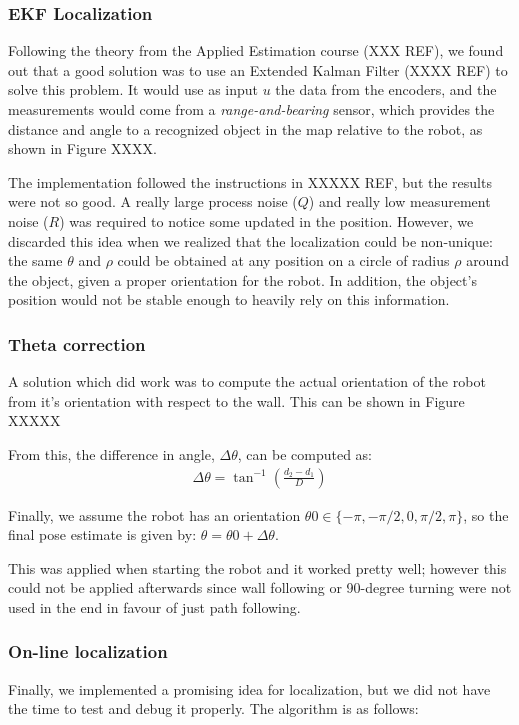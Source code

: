 \subsubsection{EKF Localization}
Following the theory from the Applied Estimation course (XXX REF), we found out that a good solution was to use an Extended Kalman Filter (XXXX REF) to solve this problem. It would use as input $u$ the data from the encoders, and the measurements would come from a \emph{range-and-bearing} sensor, which provides the distance and angle to a recognized object in the map relative to the robot, as shown in Figure XXXX.

The implementation followed the instructions in XXXXX REF, but the results were not so good. A really large process noise ($Q$) and really low measurement noise ($R$) was required to notice some updated in the position. However, we discarded this idea when we realized that the localization could be non-unique: the same $\theta$ and $\rho$ could be obtained at any position on a circle of radius $\rho$ around the object, given a proper orientation for the robot. In addition, the object's position would not be stable enough to heavily rely on this information. 

\subsubsection{Theta correction}
A solution which did work was to compute the actual orientation of the robot from it's orientation with respect to the wall. This can be shown in Figure XXXXX


From this, the difference in angle, $\Delta\theta$, can be computed as:
\begin{align}
\label{eq:locTheta}
\Delta\theta = \tan^{-1}\left(\frac{d_2 - d_1}{D}\right)
\end{align}

Finally, we assume the robot has an orientation $\theta0 \in \{-\pi, -\pi/2, 0, \pi/2, \pi\}$, so the final pose estimate is given by: $\theta = \theta0 + \Delta\theta$.

This was applied when starting the robot and it worked pretty well; however this could not be applied afterwards since wall following or 90-degree turning were not used in the end in favour of just path following.  

\subsubsection{On-line localization}
Finally, we implemented a promising idea for localization, but we did not have the time to test and debug it properly. The algorithm is as follows:


